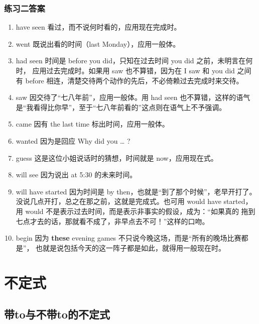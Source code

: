 \subsection{练习二答案}

\begin{enumerate}
\item have seen 看过，而不说何时看的，应用现在完成时。

\item went 既说出看的时间（last Monday），应用一般体。

\item had seen 时间是 before you did，只知在过去时间 you did 之前，未明言在何时，
  应用过去完成时。如果用 saw 也不算错，因为在 I saw 和 you did 之间有 before
  相连，清楚交待两个动作的先后，不必倚赖过去完成时来交待。

\item saw 因交待了“七八年前”，应用一般体。用 had seen 也不算错，这样的语气
  是“我看得比你早”，至于“七八年前看的”这点则在语气上不予强调。

\item came 因有 the last time 标出时间，应用一般体。

\item wanted 因为是回应 Why did you \ldots{} ?

\item guess 这是这位小姐说话时的猜想，时间就是 now，应用现在式。

\item will see 因为说出 at 5:30 的未来时间。

\item will have started 因为时间是 by then，也就是“到了那个时候”，老早开打了。
  没说几点开打，总之在那之前，这就是完成式。也可用 would have
  started，用 would 不是表示过去时间，而是表示非事实的假设，成为：“如果真的
  拖到七点才去的话，那就看不成了，非早点去不可！”这样的口吻。

\item begin 因为 \textbf{these} evening games 不只说今晚这场，而是“所有的晚场比赛都是”，
  也就是说包括今天的这一阵子都是如此，就得用一般现在时。
\end{enumerate}

\chapter{不定式}

\section{带to与不带to的不定式}

